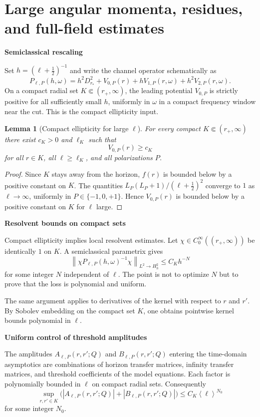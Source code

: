\documentclass[12pt]{article}
\numberwithin{equation}{section}
\theoremstyle{plain}
\newtheorem{lemma}[theorem]{Lemma}
\theoremstyle{definition}
\theoremstyle{remark}
\newcommand{\om}{\omega}
\newcommand{\angles}[1]{\left\langle #1 \right\rangle}
\newcommand{\abs}[1]{\left|#1\right|}
\newcommand{\norm}[1]{\left\|#1\right\|}
\newcommand{\appheading}[1]{\par\medskip\noindent\textbf{#1}\par\smallskip\noindent}
\begin{document}
\section{Large angular momenta, residues, and full-field estimates}\label{app:large_ell}
\appheading{Semiclassical rescaling}

Set $h=(\ell+\tfrac12)^{-1}$ and write the channel operator schematically as
\[
   P_{\ell,P}(h,\om)=h^2D_{r_*}^2+V_{0,P}(r)+hV_{1,P}(r,\om)+h^2V_{2,P}(r,\om).
\]
On a compact radial set $K\Subset(r_+,\infty)$, the leading potential $V_{0,P}$ is strictly positive for all sufficiently small $h$, uniformly in $\om$ in a compact frequency window near the cut.  This is the compact ellipticity input.

\begin{lemma}[Compact ellipticity for large $\ell$]\label{lem:compact_ellipticity}
For every compact $K\Subset(r_+,\infty)$ there exist $c_K>0$ and $\ell_K$ such that
\[
   V_{0,P}(r)\ge c_K
\]
for all $r\in K$, all $\ell\ge\ell_K$, and all polarizations $P$.
\end{lemma}

\begin{proof}
Since $K$ stays away from the horizon, $f(r)$ is bounded below by a positive constant on $K$.  The quantities $L_P(L_P+1)/(\ell+\frac12)^2$ converge to $1$ as $\ell\to\infty$, uniformly in $P\in\{-1,0,+1\}$.  Hence $V_{0,P}(r)$ is bounded below by a positive constant on $K$ for $\ell$ large.
\end{proof}

\appheading{Resolvent bounds on compact sets}

Compact ellipticity implies local resolvent estimates.  Let $\chi\in C_0^\infty((r_+,\infty))$ be identically $1$ on $K$.  A semiclassical parametrix gives
\[
   \norm{\chi P_{\ell,P}(h,\om)^{-1}\chi}_{L^2\to H^2_h}
   \le C_K h^{-N}
\]
for some integer $N$ independent of $\ell$.  The point is not to optimize $N$ but to prove that the loss is polynomial and uniform.

The same argument applies to derivatives of the kernel with respect to $r$ and $r'$.  By Sobolev embedding on the compact set $K$, one obtains pointwise kernel bounds polynomial in $\ell$.

\appheading{Uniform control of threshold amplitudes}

The amplitudes $A_{\ell,P}(r,r';Q)$ and $B_{\ell,P}(r,r';Q)$ entering the time-domain asymptotics are combinations of horizon transfer matrices, infinity transfer matrices, and threshold coefficients of the model equations.  Each factor is polynomially bounded in $\ell$ on compact radial sets.  Consequently
\[
   \sup_{r,r'\in K}
   \bigl(
      \abs{A_{\ell,P}(r,r';Q)}+\abs{B_{\ell,P}(r,r';Q)}
   \bigr)
   \le C_K\angles{\ell}^{N_0}
\]
for some integer $N_0$.
\end{document}
